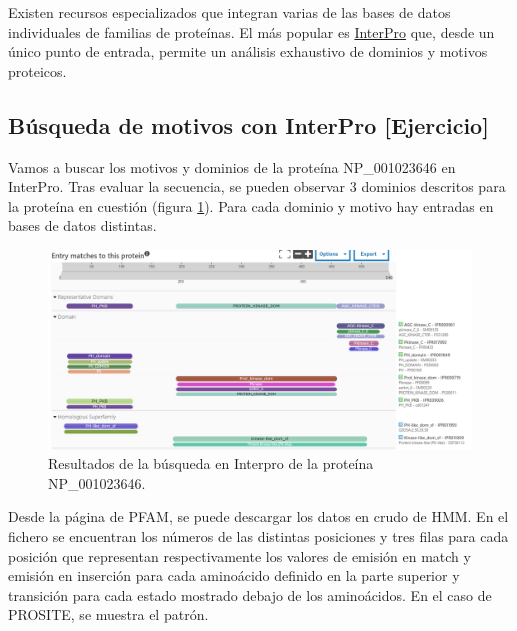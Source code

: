 Existen recursos especializados que integran varias de las bases de datos individuales de familias de proteínas. El más popular es \href{https://www.ebi.ac.uk/interpro/}{InterPro} que, desde un único punto de entrada, permite un análisis exhaustivo de dominios y motivos proteicos.

\subsection{Búsqueda de motivos con InterPro [Ejercicio]}
Vamos a buscar los motivos y dominios de la proteína NP\_001023646 en InterPro. Tras evaluar la secuencia, se pueden observar 3 dominios descritos para la proteína en cuestión (figura \ref{fig:interpro}). Para cada dominio y motivo hay entradas en bases de datos distintas. 

\begin{figure}
\centering
\includegraphics[width = \textwidth]{figs/interpro-ej.png}
\caption{Resultados de la búsqueda en Interpro de la proteína NP\_001023646.}
\label{fig:interpro}
\end{figure}

Desde la página de PFAM, se puede descargar los datos en crudo de HMM. En el fichero se encuentran los números de las distintas posiciones y tres filas para cada posición que representan respectivamente los valores de emisión en match y emisión en inserción para cada aminoácido definido en la parte superior y transición para cada estado mostrado debajo de los aminoácidos. En el caso de PROSITE, se muestra el patrón. 

